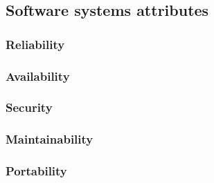 \subsection{Software systems attributes}

\subsubsection{Reliability}

\subsubsection{Availability}

\subsubsection{Security}

\subsubsection{Maintainability}

\subsubsection{Portability}
